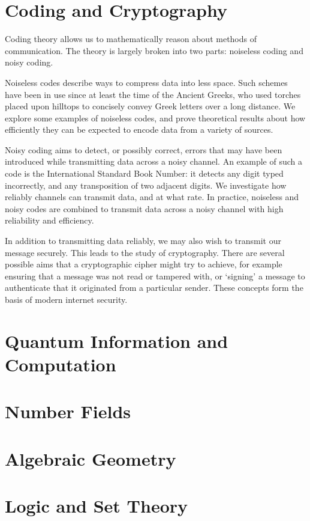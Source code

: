

\chapter{Coding and Cryptography}
Coding theory allows us to mathematically reason about methods of communication.
The theory is largely broken into two parts: noiseless coding and noisy coding.

Noiseless codes describe ways to compress data into less space.
Such schemes have been in use since at least the time of the Ancient Greeks, who used torches placed upon hilltops to concisely convey Greek letters over a long distance.
We explore some examples of noiseless codes, and prove theoretical results about how efficiently they can be expected to encode data from a variety of sources.

Noisy coding aims to detect, or possibly correct, errors that may have been introduced while transmitting data across a noisy channel.
An example of such a code is the International Standard Book Number: it detects any digit typed incorrectly, and any transposition of two adjacent digits.
We investigate how reliably channels can transmit data, and at what rate.
In practice, noiseless and noisy codes are combined to transmit data across a noisy channel with high reliability and efficiency.

In addition to transmitting data reliably, we may also wish to transmit our message securely.
This leads to the study of cryptography.
There are several possible aims that a cryptographic cipher might try to achieve, for example ensuring that a message was not read or tampered with, or `signing' a message to authenticate that it originated from a particular sender.
These concepts form the basis of modern internet security.



\chapter{Quantum Information and Computation}

\chapter{Number Fields}

\chapter{Algebraic Geometry}

\chapter{Logic and Set Theory}



